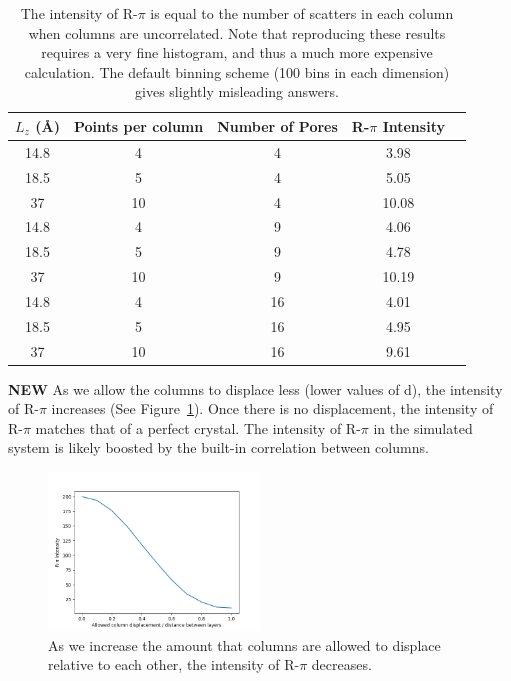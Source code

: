 \documentclass{article}
\begin{document}
  \begin{table}[!htb]
  \centering
  \begin{tabular}{c c c c c}
  \toprule
  $L_z$ (\AA) & Points per column & Number of Pores &  R-$\pi$ Intensity\\ 
  \midrule
  14.8        &      4            & 4               & 3.98              \\
  18.5        &      5            & 4               & 5.05              \\
  37          &      10           & 4               & 10.08             \\
  14.8        &      4            & 9               & 4.06              \\
  18.5        &      5            & 9               & 4.78              \\
  37          &      10           & 9               & 10.19             \\
  14.8        &      4            & 16              & 4.01              \\
  18.5        &      5            & 16              & 4.95              \\
  37          &      10           & 16              & 9.61              \\
  \bottomrule
  \end{tabular}
  \caption{The intensity of R-$\pi$ is equal to the number of scatters in each
	  column when columns are uncorrelated. Note that reproducing these results
	  requires a very fine histogram, and thus a much more expensive calculation. The
	  default binning scheme (100 bins in each dimension) gives slightly misleading
	  answers.
   }\label{table:randomly_displaced_columns}
  \end{table}

  \textbf{NEW} As we allow the columns to displace less (lower values of d),
  the intensity of R-$\pi$ increases (See Figure~\ref{fig:column_displacement}).
  Once there is no displacement, the intensity of R-$\pi$ matches that of a
  perfect crystal. The intensity of R-$\pi$ in the simulated system is likely
  boosted by the built-in correlation between columns.

  \begin{figure}[!htb]
  \centering
  \includegraphics[width=0.5\textwidth]{column_displacement.png}
  \caption{As we increase the amount that columns are allowed to displace relative
  to each other, the intensity of R-$\pi$ decreases.}\label{fig:column_displacement}
  \end{figure} 
\end{document}
